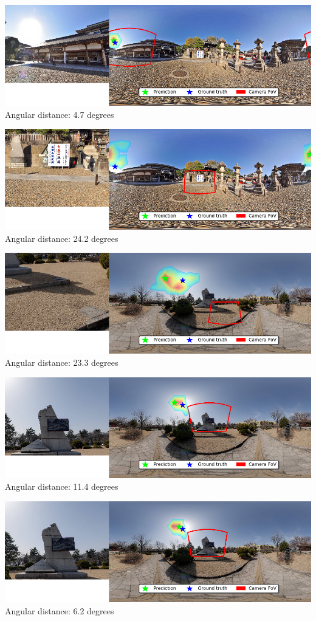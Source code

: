 \begin{multicols}{2}
\includegraphics[width=\mywidth]{pano_aaqpmaoqocdqfu_006.jpg}\\
Angular distance: 4.7 degrees

\includegraphics[width=\mywidth]{pano_aaqpmaoqocdqfu.jpg}\\
Angular distance: 24.2 degrees

\includegraphics[width=\mywidth]{pano_aarqodbwuocbxc_005.jpg}\\
Angular distance: 23.3 degrees

\includegraphics[width=\mywidth]{pano_aarqodbwuocbxc_003.jpg}\\
Angular distance: 11.4 degrees

\includegraphics[width=\mywidth]{pano_aarqodbwuocbxc.jpg}\\
Angular distance: 6.2 degrees


\end{multicols}
